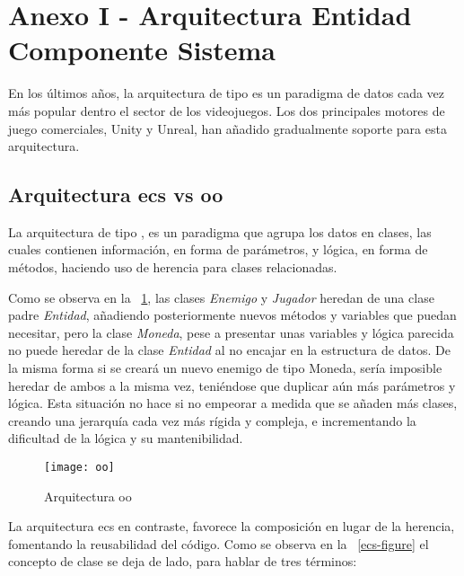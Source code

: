 \chapter*{Anexo I - Arquitectura Entidad Componente Sistema}
\label{cap:annex1}

En los últimos años, la arquitectura de tipo  es un paradigma de datos
cada vez más popular dentro el sector de los videojuegos\cite{evolve-ecs}\cite{mmog-ecs}. Los dos principales motores de juego comerciales, Unity\cite{unity}
y Unreal\cite{unreal}, han añadido gradualmente soporte para esta arquitectura\cite{unity-ecs}\cite{unreal-ecs}.
\section*{Arquitectura \gls{ecs} vs \gls{oo}}

La arquitectura de tipo , es un paradigma que agrupa los datos en clases, las cuales contienen
información, en forma de parámetros, y lógica, en forma de métodos, haciendo uso de herencia para clases relacionadas.

Como se observa en la \figurename~\ref{oo-figure}, las clases \textit{Enemigo} y 
\textit{Jugador} heredan de una clase padre \textit{Entidad}, añadiendo posteriormente nuevos métodos y
variables que puedan necesitar, pero la clase \textit{Moneda}, pese a presentar unas variables y lógica parecida 
no puede heredar de la clase \textit{Entidad} al no encajar en la estructura de datos. De la misma forma si se creará
un nuevo enemigo de tipo Moneda, sería imposible heredar de ambos a la misma vez, teniéndose que duplicar aún más
parámetros y lógica. Esta situación no hace si no empeorar a medida que se añaden más clases, creando una jerarquía
cada vez más rígida y compleja, e incrementando la dificultad de la lógica y su mantenibilidad.

\begin{figure}[!h]
	\centering
	\texttt{[image: oo]}
	\caption{Arquitectura \gls{oo}}
	\label{oo-figure}
\end{figure}

\newpage

La arquitectura \gls{ecs} en contraste, favorece la composición en lugar de la herencia, fomentando la reusabilidad del 
código. Como se observa en la \figurename~\ref{ecs-figure} el concepto de clase se deja de lado, para hablar de tres términos:

